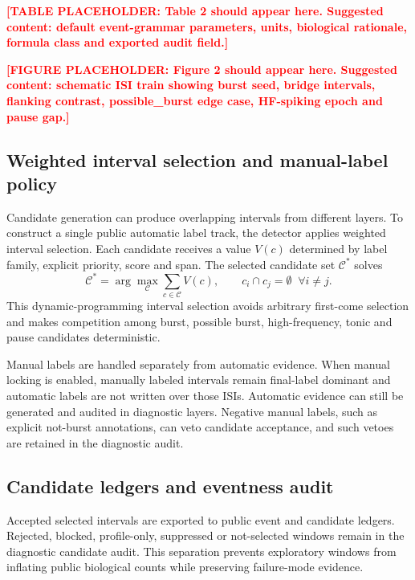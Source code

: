 \documentclass[pdflatex,sn-apa]{sn-jnl}
\newcommand{\TODOFIG}[1]{\par\medskip\noindent\textbf{\textcolor{red}{[FIGURE PLACEHOLDER: #1]}}\par\medskip}
\newcommand{\TODOTAB}[1]{\par\medskip\noindent\textbf{\textcolor{red}{[TABLE PLACEHOLDER: #1]}}\par\medskip}
\begin{document}
\TODOTAB{Table 2 should appear here. Suggested content: default event-grammar parameters, units, biological rationale, formula class and exported audit field.}

\TODOFIG{Figure 2 should appear here. Suggested content: schematic ISI train showing burst seed, bridge intervals, flanking contrast, possible\_burst edge case, HF-spiking epoch and pause gap.}

\subsection{Weighted interval selection and manual-label policy}

Candidate generation can produce overlapping intervals from different layers. To construct a single public automatic label track, the detector applies weighted interval selection. Each candidate receives a value $V(c)$ determined by label family, explicit priority, score and span. The selected candidate set $\mathcal{C}^{\ast}$ solves
\begin{equation}
    \mathcal{C}^{\ast}
    =
    \arg\max_{\mathcal{C}}
    \sum_{c\in\mathcal{C}} V(c),
    \qquad
    c_i\cap c_j=\emptyset \;\; \forall i\ne j.
\end{equation}
This dynamic-programming interval selection avoids arbitrary first-come selection and makes competition among burst, possible burst, high-frequency, tonic and pause candidates deterministic.

Manual labels are handled separately from automatic evidence. When manual locking is enabled, manually labeled intervals remain final-label dominant and automatic labels are not written over those ISIs. Automatic evidence can still be generated and audited in diagnostic layers. Negative manual labels, such as explicit not-burst annotations, can veto candidate acceptance, and such vetoes are retained in the diagnostic audit.

\subsection{Candidate ledgers and eventness audit}

Accepted selected intervals are exported to public event and candidate ledgers. Rejected, blocked, profile-only, suppressed or not-selected windows remain in the diagnostic candidate audit. This separation prevents exploratory windows from inflating public biological counts while preserving failure-mode evidence.
\end{document}
